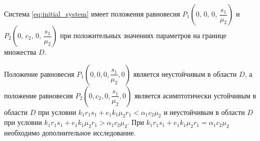 \documentclass[14pt,a4paper]{extarticle}
\begin{document}
	\begin{theorem}
		Система \ref{eq:initial_system} имеет положения равновесия $P_1\left(0,\, 0,\,0,\,\dfrac{s_1}{\mu_2}\right)$ и $P_2\left(0,\, c_2,\,0,\,\dfrac{s_1}{\mu_2}\right)$ при положительных значениях параметров на границе множества $D$.  
	\end{theorem}
	
	\begin{theorem}
		Положение равновесия $P_1\left(0,0,0,\dfrac{s_1}{\mu_2},0\right)$ является неустойчивым в области $D$, а положение равновесия $P_2\left(0,c_2,0,\dfrac{s_1}{\mu_2},0\right)$ является асимптотически устойчивым в области $D$ при условии $k_1r_1s_1 + e_1k_1\mu_2r_1 < \alpha_1c_2\mu_2$ и неустойчивым в области $D$ при условии $k_1r_1s_1 + e_1k_1\mu_2r_1>\alpha_1c_2\mu_2$. При $k_1r_1s_1 + e_1k_1\mu_2r_1 = \alpha_1c_2\mu_2$ необходимо дополнительное исследование.
	\end{theorem}
	
\end{document}
